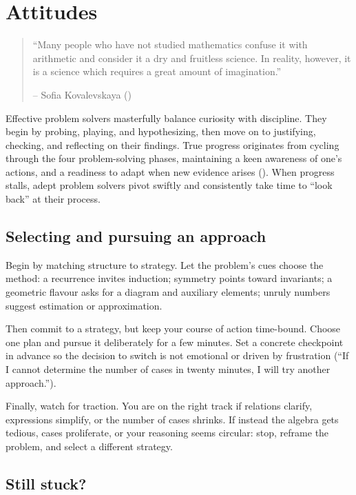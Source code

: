 \documentclass[
  a4paper,
  DIV=11,
  numbers=noendperiod,
  oneside]{scrreprt}
\begin{document}
\chapter{Attitudes}\label{sec-attitudes}

\begin{quote}
``Many people who have not studied mathematics confuse it with
arithmetic and consider it a dry and fruitless science. In reality,
however, it is a science which requires a great amount of imagination.''

-- Sofia Kovalevskaya ()
\end{quote}

Effective problem solvers masterfully balance curiosity with discipline.
They begin by probing, playing, and hypothesizing, then move on to
justifying, checking, and reflecting on their findings. True progress
originates from cycling through the four problem-solving phases,
maintaining a keen awareness of one's actions, and a readiness to adapt
when new evidence arises (). When
progress stalls, adept problem solvers pivot swiftly and consistently
take time to ``look back'' at their process.

\section{Selecting and pursuing an
approach}\label{selecting-and-pursuing-an-approach}

Begin by matching structure to strategy. Let the problem's cues choose
the method: a recurrence invites induction; symmetry points toward
invariants; a geometric flavour asks for a diagram and auxiliary
elements; unruly numbers suggest estimation or approximation.

Then commit to a strategy, but keep your course of action time-bound.
Choose one plan and pursue it deliberately for a few minutes. Set a
concrete checkpoint in advance so the decision to switch is not
emotional or driven by frustration (``If I cannot determine the number
of cases in twenty minutes, I will try another approach.'').

Finally, watch for traction. You are on the right track if relations
clarify, expressions simplify, or the number of cases shrinks. If
instead the algebra gets tedious, cases proliferate, or your reasoning
seems circular: stop, reframe the problem, and select a different
strategy.

\section{Still stuck?}\label{still-stuck}
\end{document}
